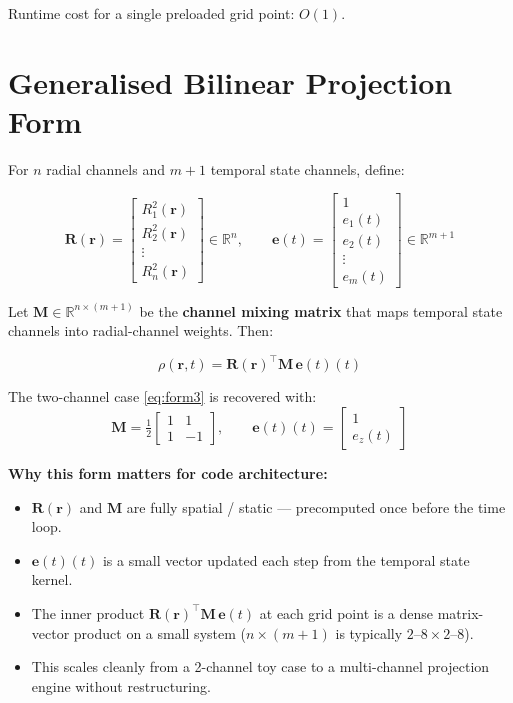 \documentclass[11pt, a4paper, oneside]{article}
\newcommand{\Ri}[1]{R_{#1}^2(\mathbf{r})}          %
\newcommand{\ez}{e_z(t)}
\newcommand{\Rvec}{\mathbf{R}(\mathbf{r})}
\newcommand{\Mmat}{\mathbf{M}}
\newcommand{\evec}{\mathbf{e}(t)}
\begin{document}
Runtime cost for a single preloaded grid point: $O(1)$.

\section{Generalised Bilinear Projection Form}
\label{sec:general}

For $n$ radial channels and $m+1$ temporal state channels, define:

\begin{equation}
  \Rvec =
  \begin{bmatrix} \Ri{1} \\ \Ri{2} \\ \vdots \\ R_n^2(\mathbf{r}) \end{bmatrix}
  \in \mathbb{R}^n,
  \qquad
  \evec =
  \begin{bmatrix} 1 \\ e_1(t) \\ e_2(t) \\ \vdots \\ e_m(t) \end{bmatrix}
  \in \mathbb{R}^{m+1}
  \label{eq:Re_general}
\end{equation}

Let $\Mmat \in \mathbb{R}^{n \times (m+1)}$ be the \textbf{channel mixing matrix}
that maps temporal state channels into radial-channel weights. Then:

\begin{equation}
  \boxed{\rho(\mathbf{r},t) = \Rvec^\top \Mmat\, \evec(t)}
  \label{eq:bilinear}
\end{equation}

\medskip
The two-channel case \eqref{eq:form3} is recovered with:
\begin{equation}
  \Mmat = \tfrac{1}{2}
  \begin{bmatrix}
	1 &  1 \\
	1 & -1
  \end{bmatrix},
  \qquad
  \evec(t) =
  \begin{bmatrix} 1 \\ \ez \end{bmatrix}
  \label{eq:M2}
\end{equation}

\medskip
\noindent\textbf{Why this form matters for code architecture:}
\begin{itemize}
  \item $\Rvec$ and $\Mmat$ are fully spatial / static — precomputed
	once before the time loop.
  \item $\evec(t)$ is a small vector updated each step from
	the temporal state kernel.
  \item The inner product $\Rvec^\top \Mmat\,\evec$ at each grid point
	is a dense matrix-vector product on a small system
	($n \times (m+1)$ is typically $2$--$8 \times 2$--$8$).
  \item This scales cleanly from a 2-channel toy case
	to a multi-channel projection engine without restructuring.
\end{itemize}
\end{document}
